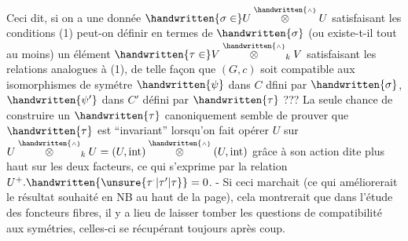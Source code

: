 Ceci dit, si on a une donnée $\handwritten{\sigma\in}U\overset{\handwritten{\scriptscriptstyle\wedge}}{\otimes} U$ satisfaisant les conditions (1) peut-on définir en termes de $\handwritten{\sigma}$ (ou existe-t-il tout au moins) un élément $\handwritten{\tau\in}V\overset{\handwritten{\scriptscriptstyle\wedge}}{\otimes}_k V$ satisfaisant les relations analogues à (1), de telle façon que $(G,c)$ soit compatible aux isomorphismes de symétre $\handwritten{\psi}$ dans $C$ dfini par $\handwritten{\sigma}$, $\handwritten{\psi'}$ dans $C'$ défini par $\handwritten{\tau}$ ??? La seule chance de  construire un $\handwritten{\tau}$ canoniquement semble de prouver que $\handwritten{\tau}$ est ``invariant'' lorsqu'on fait opérer $U$ sur $U\overset{\handwritten{\scriptscriptstyle\wedge}}{\otimes}_k U=(U,\mathrm{int})\overset{\handwritten{\scriptscriptstyle\wedge}}{\otimes}(U,\mathrm{int})$ grâce à son action dite plus haut sur les deux facteurs, ce qui s'exprime par la relation $U^+ .\handwritten{\unsure{\tau^{\scriptscriptstyle\cdot}|\tau'|\tau}}=0$. - Si ceci marchait (ce qui améliorerait le résultat souhaité en NB au haut de la page), cela montrerait que dans l'étude des foncteurs fibres, il y a lieu de laisser tomber les questions de compatibilité aux symétries, celles-ci se récupérant toujours après coup.

